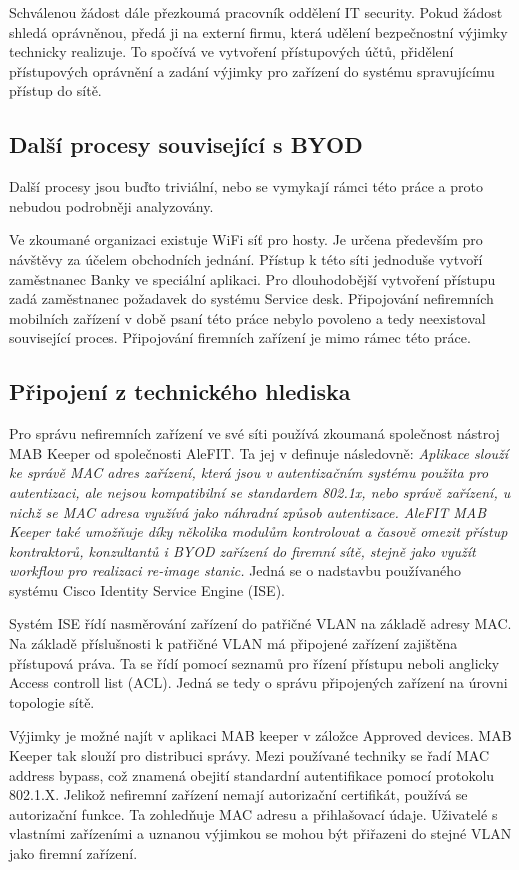 Schválenou žádost dále přezkoumá pracovník oddělení IT security. Pokud žádost shledá oprávněnou, předá ji na externí firmu, která udělení bezpečnostní výjimky technicky realizuje. To spočívá ve vytvoření přístupových účtů, přidělení přístupových oprávnění a zadání výjimky pro zařízení do systému spravujícímu přístup do sítě. 

\subsection{Další procesy související s BYOD}
Další procesy jsou buďto triviální, nebo se vymykají rámci této práce a proto nebudou podrobněji analyzovány.

Ve zkoumané organizaci existuje WiFi síť pro hosty.  Je určena především pro návštěvy za účelem obchodních jednání. Přístup k této síti jednoduše vytvoří zaměstnanec Banky ve speciální aplikaci. Pro dlouhodobější vytvoření přístupu zadá zaměstnanec požadavek do systému Service desk.
Připojování nefiremních mobilních zařízení v době psaní této práce nebylo povoleno a tedy neexistoval související proces. Připojování firemních zařízení je mimo rámec této práce. 

\subsection{Připojení z technického hlediska}

Pro správu nefiremních zařízení ve své síti používá zkoumaná společnost nástroj MAB Keeper od společnosti AleFIT. Ta jej v \cite{MABKeeper} definuje následovně: \textit{Aplikace slouží ke správě MAC adres zařízení, která jsou v autentizačním systému použita pro autentizaci, ale nejsou kompatibilní se standardem 802.1x, nebo správě zařízení, u nichž se MAC adresa využívá jako náhradní způsob autentizace. AleFIT MAB Keeper také umožňuje díky několika modulům kontrolovat a časově omezit přístup kontraktorů, konzultantů i BYOD zařízení do firemní sítě, stejně jako využít workflow pro realizaci re-image stanic.} Jedná se o nadstavbu používaného systému Cisco Identity Service Engine (ISE).


Systém ISE řídí nasměrování zařízení do patřičné VLAN na základě adresy MAC. Na základě příslušnosti k patřičné VLAN má připojené zařízení zajištěna přístupová práva. Ta se řídí pomocí seznamů pro řízení přístupu neboli anglicky Access controll list (ACL). Jedná se tedy o správu připojených zařízení na úrovni topologie sítě. 

Výjimky je možné najít v aplikaci MAB keeper v záložce Approved devices. MAB Keeper tak slouží pro distribuci správy. Mezi používané techniky se řadí MAC address bypass, což znamená obejití standardní autentifikace pomocí protokolu 802.1.X. Jelikož nefiremní zařízení nemají autorizační certifikát, používá se autorizační funkce. Ta zohledňuje MAC adresu a přihlašovací údaje. Uživatelé s vlastními zařízeními a uznanou výjimkou se mohou být přiřazeni do stejné VLAN jako firemní zařízení.


